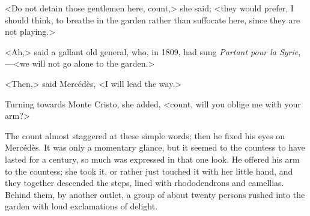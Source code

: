  <Do not detain those gentlemen here, count,> she said; <they would prefer, I should think, to breathe in the garden rather than suffocate here, since they are not playing.> 

 <Ah,> said a gallant old general, who, in 1809, had sung \textit{Partant pour la Syrie},—<we will not go alone to the garden.> 

 <Then,> said Mercédès, <I will lead the way.> 

 Turning towards Monte Cristo, she added, <count, will you oblige me with your arm?> 

 The count almost staggered at these simple words; then he fixed his eyes on Mercédès. It was only a momentary glance, but it seemed to the countess to have lasted for a century, so much was expressed in that one look. He offered his arm to the countess; she took it, or rather just touched it with her little hand, and they together descended the steps, lined with rhododendrons and camellias. Behind them, by another outlet, a group of about twenty persons rushed into the garden with loud exclamations of delight. 